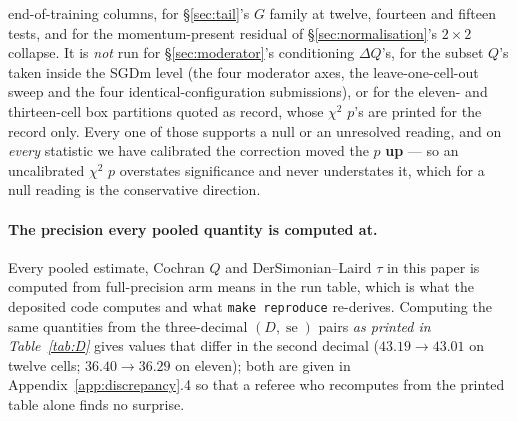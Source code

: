 \documentclass[10pt,letterpaper]{article}
\newcommand{\Dstat}{D}                         %
\newcommand{\Gstat}{G}                         %
\DeclareMathOperator{\se}{se}
\begin{document}
end-of-training columns, for \S\ref{sec:tail}'s $\Gstat$ family at twelve, fourteen and fifteen
tests, and for the momentum-present residual of \S\ref{sec:normalisation}'s $2 \times 2$
collapse. It is \emph{not} run for \S\ref{sec:moderator}'s conditioning $\Delta Q$'s, for the subset $Q$'s taken inside the
SGDm level (the four moderator axes, the leave-one-cell-out sweep and the four
identical-configuration submissions), or for the eleven- and thirteen-cell box partitions quoted
as record, whose $\chi^2$ $p$'s are printed for the record only. Every one of those supports a
null or an unresolved reading, and on \emph{every} statistic we have calibrated the correction moved the $p$
\textbf{up} --- so an uncalibrated $\chi^2$ $p$ overstates significance and never understates it,
which for a null reading is the conservative direction.

\paragraph{The precision every pooled quantity is computed at.}
Every pooled estimate, Cochran $Q$ \citep{cochran1954combination} and DerSimonian--Laird
$\tau$ \citep{dersimonian1986meta} in this paper is computed from full-precision arm means in
the run table, which is what the deposited code computes and what \texttt{make reproduce}
re-derives. Computing the same quantities from the three-decimal $(\Dstat, \se)$ pairs
\emph{as printed in Table~\ref{tab:D}} gives values that differ in the second decimal
($43.19 \rightarrow 43.01$ on twelve cells; $36.40 \rightarrow 36.29$ on eleven); both are
given in Appendix~\ref{app:discrepancy}.4 so that a referee who recomputes from the printed
table alone finds no surprise.
\end{document}
